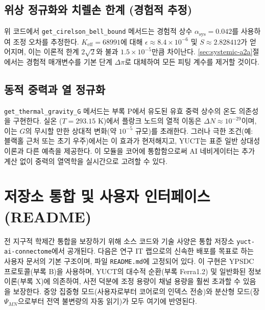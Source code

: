 \documentclass[11pt,a4paper]{article}
\begin{document}
	\subsection{위상 정규화와 치렐손 한계 (경험적 추정)}
	\label{sec:bell-regularization}
	
	위 코드에서 \texttt{get\_cirelson\_bell\_bound} 메서드는 경험적 상수 \(\alpha_{\text{sys}} = 0.042\)를 사용하여 조정 오차를 추정한다. \(K_{\mathrm{eff}} = 68991\)에 대해 \(\epsilon \approx 8.4 \times 10^{-6}\) 및 \(S \approx 2.828412\)가 얻어지며, 이는 이론적 한계 \(2\sqrt{2}\)와 불과 \(1.5 \times 10^{-5}\)만큼 차이난다. \ref{sec:systemic-a2a}절에서는 경험적 매개변수를 기본 단계 \(\Delta\pi\)로 대체하여 모든 피팅 계수를 제거할 것이다.
	
	\subsection{동적 중력과 열 정규화}
	\label{subsec:thermal-gravity}
	
	\texttt{get\_thermal\_gravity\_G} 메서드는 부록 P에서 유도된 유효 중력 상수의 온도 의존성을 구현한다. 실온 (\(T = 293.15\) K)에서 플랑크 노드의 열적 이동은 \(\Delta N \approx 10^{-29}\)이며, 이는 \(G\)의 무시할 만한 상대적 변화(약 \(10^{-5}\) 규모)를 초래한다. 그러나 극한 조건(예: 블랙홀 근처 또는 초기 우주)에서는 이 효과가 현저해지고, YUCT는 표준 일반 상대성 이론과 다른 예측을 제공한다. 이 모듈을 코어에 통합함으로써 AI 네비게이터는 추가 계산 없이 중력의 열역학을 실시간으로 고려할 수 있다.
	
	\section{저장소 통합 및 사용자 인터페이스 (README)}
	전 지구적 학제간 통합을 보장하기 위해 소스 코드와 기술 사양은 통합 저장소 \texttt{yuct-ai-connectome}에서 공개된다. 다음은 연구 IT 랩으로의 신속한 배포를 목표로 하는 사용자 문서의 기본 구조이며, 파일 \texttt{README.md}에 고정되어 있다. 이 구현은 YPSDC 프로토콜(부록 B)을 사용하며, YUCT의 대수적 순환(부록 Ferra1.2) 및 일반화된 정보 이론(부록 X)에 의존하여, 사전 덕분에 조정 용량이 채널 용량을 훨씬 초과할 수 있음을 보장한다. 중앙 집중형 모드(사용자로부터 코어로의 인덱스 전송)와 분산형 모드(장 \(\Psi_{MN}\)으로부터 전역 불변량의 자동 읽기)가 모두 여기에 반영된다.
	
\end{document}
